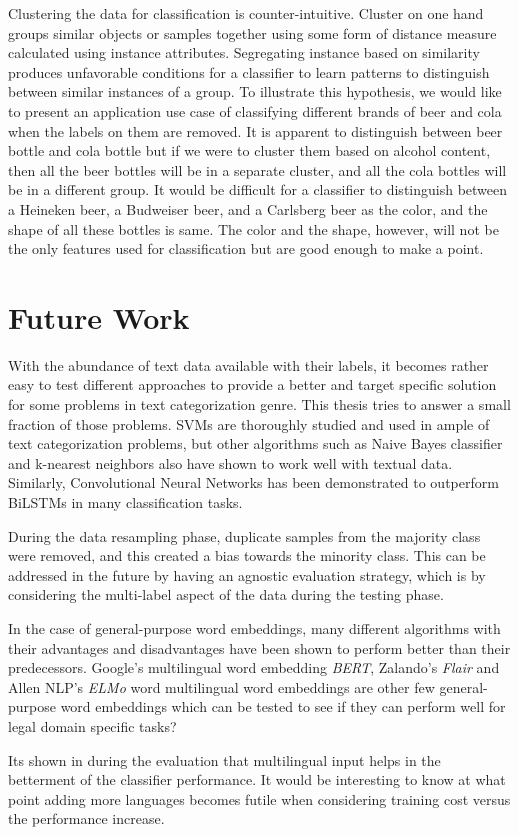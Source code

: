 Clustering the data for classification is counter-intuitive. Cluster on one hand groups similar objects or samples together using some form of distance measure calculated using instance attributes. Segregating instance based on similarity produces unfavorable conditions for a classifier to learn patterns to distinguish between similar instances of a group. To illustrate this hypothesis, we would like to present an application use case of classifying different brands of beer and cola when the labels on them are removed. It is apparent to distinguish between beer bottle and cola bottle but if we were to cluster them based on alcohol content, then all the beer bottles will be in a separate cluster, and all the cola bottles will be in a different group. It would be difficult for a classifier to distinguish between a Heineken beer, a Budweiser beer, and a Carlsberg beer as the color, and the shape of all these bottles is same. The color and the shape, however, will not be the only features used for classification but are good enough to make a point.

\section{Future Work}\label{sec:futureWorks}

With the abundance of text data available with their labels, it becomes rather easy to test different approaches to provide a better and target specific solution for some problems in text categorization genre.  This thesis tries to answer a small fraction of those problems.  \glspl{SVM} are thoroughly studied and used in ample of text categorization problems, but other algorithms such as Naive Bayes classifier and k-nearest neighbors also have shown to work well with textual data. Similarly,  Convolutional Neural Networks has been demonstrated to outperform \glspl{BiLSTM} in many classification tasks.

During the data resampling phase, duplicate samples from the majority class were removed, and this created a bias towards the minority class. This can be addressed in the future by having an agnostic evaluation strategy, which is by considering the multi-label aspect of the data during the testing phase.

In the case of general-purpose word embeddings, many different algorithms with their advantages and disadvantages have been shown to perform better than their predecessors. Google's multilingual word embedding \textit{BERT}, Zalando's \textit{Flair} and Allen NLP's \textit{ELMo} word multilingual word embeddings are other few general-purpose word embeddings which can be tested to see if they can perform well for legal domain specific tasks?

Its shown in during the evaluation that multilingual input helps in the betterment of the classifier performance. It would be interesting to know at what point adding more languages becomes futile when considering training cost versus the performance increase.



